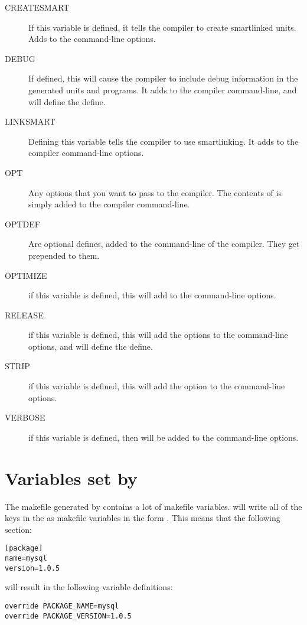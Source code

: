 {\begin{description}
\item[CREATESMART] If this variable is defined, it tells the compiler to 
create smartlinked units. Adds  to the command-line options.
\item[DEBUG] If defined, this will cause the compiler to include debug information in
the generated units and programs. It adds  to the compiler
command-line, and will define the  define.
\item[LINKSMART] Defining this variable tells the compiler to use smartlinking. 
It adds  to the compiler command-line options.
\item[OPT] Any options that you want to pass to the compiler. The contents
of  is simply added to the compiler command-line.
\item[OPTDEF] Are optional defines, added to the command-line of the
compiler. They get  prepended to them.
\item[OPTIMIZE] if this variable is defined, this will add  to
the command-line options.
\item[RELEASE] if this variable is defined, this will add the  
options to the command-line options, and will define the  define.
\item[STRIP] if this variable is defined, this will add the  option 
to the command-line options.
\item[VERBOSE] if this variable is defined, then  will be added
to the command-line options.
\end{description}

\section{Variables set by \fpcmake{}}

The makefile generated by \fpcmake{} contains a lot of makefile variables.
\fpcmake{} will write all of the keys in the  as
makefile variables in the form . This means that the
following section:
\begin{verbatim}
[package]
name=mysql
version=1.0.5
\end{verbatim}
will result in the following variable definitions:
\begin{verbatim}
override PACKAGE_NAME=mysql
override PACKAGE_VERSION=1.0.5
\end{verbatim}

}

